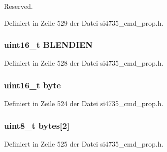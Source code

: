 Reserved. 



Definiert in Zeile 529 der Datei si4735\+\_\+cmd\+\_\+prop.\+h.

\hypertarget{unionfm__rsq__int__source_a7b7709a5bcf7ccd961a3527020b8b6b3}{}
\subsubsection[{B\+L\+E\+N\+D\+I\+E\+N}]{\setlength{\rightskip}{0pt plus 5cm}uint16\+\_\+t B\+L\+E\+N\+D\+I\+E\+N}\label{unionfm__rsq__int__source_a7b7709a5bcf7ccd961a3527020b8b6b3}


Definiert in Zeile 528 der Datei si4735\+\_\+cmd\+\_\+prop.\+h.

\hypertarget{unionfm__rsq__int__source_ab0549c1b5ea980a02e7eab77e21fea49}{}
\subsubsection[{byte}]{\setlength{\rightskip}{0pt plus 5cm}uint16\+\_\+t byte}\label{unionfm__rsq__int__source_ab0549c1b5ea980a02e7eab77e21fea49}


Definiert in Zeile 524 der Datei si4735\+\_\+cmd\+\_\+prop.\+h.

\hypertarget{unionfm__rsq__int__source_a46e4c05d20a047ec169f60d3167e912e}{}
\subsubsection[{bytes}]{\setlength{\rightskip}{0pt plus 5cm}uint8\+\_\+t bytes\mbox{[}2\mbox{]}}\label{unionfm__rsq__int__source_a46e4c05d20a047ec169f60d3167e912e}


Definiert in Zeile 525 der Datei si4735\+\_\+cmd\+\_\+prop.\+h.

\hypertarget{unionfm__rsq__int__source_a55c9ae36251cd957e3521ababda535c1}{}
